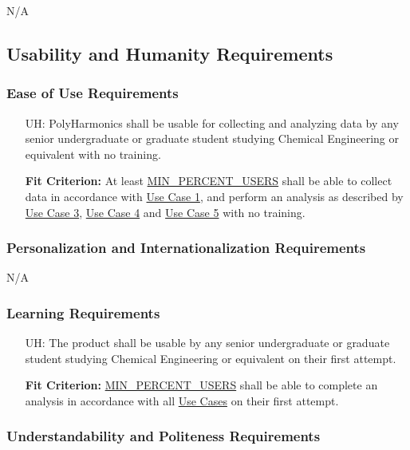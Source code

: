 \documentclass[12pt]{article}
\newcounter{uahnum}
\newcommand{\progname}{PolyHarmonics}
\begin{document}
N/A

\subsection{Usability and Humanity Requirements}

\subsubsection{Ease of Use Requirements}

\noindent \begin{itemize}
\item[UH\refstepcounter{uahnum}\theuahnum\label{NF_uah1}:] \progname{} shall be
  usable for collecting and analyzing data by any senior
  undergraduate or graduate student studying Chemical Engineering or equivalent
  with no training.

  \textbf{Fit Criterion:} At least \hyperref[AppendA]{MIN\_PERCENT\_USERS}
  shall be able to collect data in accordance with \hyperref[UseCase]{Use Case 
1}, and perform an analysis as described by \hyperref[UseCase]{Use Case 
3}, \hyperref[UseCase]{Use Case 4} and \hyperref[UseCase]{Use Case 5}
 with no training.
\end{itemize}

\subsubsection{Personalization and Internationalization Requirements}

N/A

\subsubsection{Learning Requirements}

\noindent \begin{itemize}
\item[UH\refstepcounter{uahnum}\theuahnum\label{NF_LR}:] The product shall be
  usable by any senior undergraduate or graduate student studying Chemical
  Engineering or equivalent on their first attempt.

  \textbf{Fit Criterion:} \hyperref[AppendA]{MIN\_PERCENT\_USERS} shall be able
  to complete an analysis in accordance with all \hyperref[UseCase]{Use Cases}
  on their first attempt.
\end{itemize}

\subsubsection{Understandability and Politeness Requirements}
\end{document}
